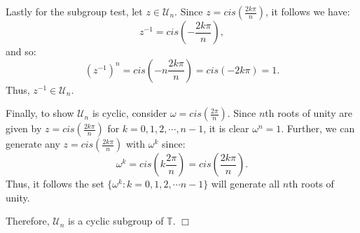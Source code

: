 \documentclass[11pt, a4paper]{article}
\begin{document}
Lastly for the subgroup test, let $z \in \mathcal{U}_{n}$. Since $z = cis \left ( \frac{2k\pi}{n} \right )$, it follows we have:
\[
  z^{-1} = cis \left (- \frac{2k\pi}{n} \right ),
\]
and so:
\[
  (z^{-1})^n = cis \left (-n \frac{2k\pi}{n} \right ) = cis(-2k\pi) = 1.
\]
Thus, $z^{-1} \in \mathcal{U}_{n}$.

Finally, to show $\mathcal{U}_{n}$ is cyclic, consider $\omega = cis \left ( \frac{2\pi}{n} \right )$. Since $n$th roots of unity are given by $z = cis \left ( \frac{2k\pi}{n} \right )$ for $k = 0, 1, 2, \cdots, n - 1$, it is clear $\omega^n = 1$. Further, we can generate any $z = cis \left ( \frac{2k\pi}{n} \right )$ with $\omega^k$ since:
\[
  \omega^k = cis \left (k \frac{2\pi}{n} \right ) = cis \left ( \frac{2k\pi}{n} \right ).
\]
Thus, it follows the set $\{\omega^k : k = 0, 1, 2, \cdots n - 1\}$ will generate all $n$th roots of unity.

Therefore, $\mathcal{U}_{n}$ is a cyclic subgroup of $\mathbb{T}$. $\Box$

\newpage
\end{document}
